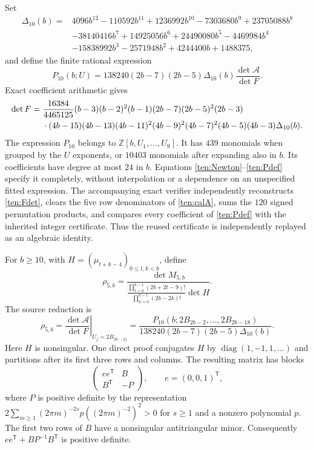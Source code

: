 \documentclass[11pt]{article}
\theoremstyle{definition}
\theoremstyle{remark}
\numberwithin{equation}{section}
\begin{document}
Set
\begin{align*}
 \Delta_{10}(b)={}&4096b^{12}-110592b^{11}+1236992b^{10}
 -7303680b^9+23705088b^8\\
 &-38140416b^7+14925056b^6+24490080b^5-4469984b^4\\
 &-15838992b^3-2571948b^2+4244400b+1488375,
\end{align*}
and define the finite rational expression
\begin{equation}\label{ten:Pdef}
 P_{10}(b;U)=138240(2b-7)(2b-5)\Delta_{10}(b)
                       \frac{\det\mathcal A}{\det F}.
\end{equation}
Exact coefficient arithmetic gives
\begin{align}\label{ten:Fdet}
 \det F={}&\frac{16384}{4465125}(b-3)(b-2)^2(b-1)
     (2b-7)(2b-5)^2(2b-3)\notag\\
 &\cdot(4b-15)(4b-13)(4b-11)^2(4b-9)^2(4b-7)^2
          (4b-5)(4b-3)\Delta_{10}(b).
\end{align}
The expression $P_{10}$ belongs to $\mathbb Z[b,U_1,\ldots,U_9]$.
It has $439$ monomials when grouped by the $U$ exponents, or
$10403$ monomials after expanding also in $b$.  Its coefficients
have degree at most $24$ in $b$.  Equations
\eqref{ten:Newton}--\eqref{ten:Pdef} specify it completely, without
interpolation or a dependence on an unspecified fitted expression.
The accompanying exact verifier independently reconstructs
\eqref{ten:Fdet}, clears the five row denominators of
\eqref{ten:calA}, sums the $120$ signed permutation products, and
compares every coefficient of \eqref{ten:Pdef} with the inherited
integer certificate.  Thus the reused certificate is independently
replayed as an algebraic identity.

For $b\ge10$, with $H=(\mu_{t+k-4})_{0\le t,k<b}$, define
\[
 \rho_{5,b}=\frac{\det M_{5,b}}
 {\displaystyle
  \frac{\prod_{t=0}^{b-1}(2b+2t-9)!}
       {\prod_{k=0}^{b-1}(2b-2k)!}\det H}.
\]
The source reduction is
\begin{equation}\label{ten:rho}
 \rho_{5,b}
 =\left.\frac{\det\mathcal A}{\det F}\right|_{U_j=2B_{2b-2j}}
 =\frac{P_{10}(b;2B_{2b-2},\ldots,2B_{2b-18})}
 {138240(2b-7)(2b-5)\Delta_{10}(b)}.
\end{equation}
Here $H$ is nonsingular.  One direct proof conjugates $H$ by
$\operatorname{diag}(1,-1,1,\ldots)$ and partitions after its first
three rows and columns.  The resulting matrix has blocks
\[
 \begin{pmatrix}ee^{\mathsf T}&B\\B^{\mathsf T}&-P\end{pmatrix},
 \qquad e=(0,0,1)^{\mathsf T},
\]
where $P$ is positive definite by the representation
$2\sum_{m\ge1}(2\pi m)^{-2s}p((2\pi m)^{-2})^2>0$ for
$s\ge1$ and a nonzero polynomial $p$.  The first two rows of $B$
have a nonsingular antitriangular minor.  Consequently
$ee^{\mathsf T}+BP^{-1}B^{\mathsf T}$ is positive definite.
\end{document}
